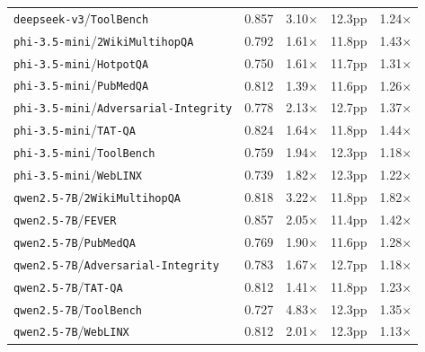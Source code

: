 \begin{longtable}{lcccc}
\texttt{deepseek-v3}/\texttt{ToolBench} & 0.857 & 3.10$\times$ & 12.3pp & 1.24$\times$ \\
\texttt{phi-3.5-mini}/\texttt{2WikiMultihopQA} & 0.792 & 1.61$\times$ & 11.8pp & 1.43$\times$ \\
\texttt{phi-3.5-mini}/\texttt{HotpotQA} & 0.750 & 1.61$\times$ & 11.7pp & 1.31$\times$ \\
\texttt{phi-3.5-mini}/\texttt{PubMedQA} & 0.812 & 1.39$\times$ & 11.6pp & 1.26$\times$ \\
\texttt{phi-3.5-mini}/\texttt{Adversarial-Integrity} & 0.778 & 2.13$\times$ & 12.7pp & 1.37$\times$ \\
\texttt{phi-3.5-mini}/\texttt{TAT-QA} & 0.824 & 1.64$\times$ & 11.8pp & 1.44$\times$ \\
\texttt{phi-3.5-mini}/\texttt{ToolBench} & 0.759 & 1.94$\times$ & 12.3pp & 1.18$\times$ \\
\texttt{phi-3.5-mini}/\texttt{WebLINX} & 0.739 & 1.82$\times$ & 12.3pp & 1.22$\times$ \\
\texttt{qwen2.5-7B}/\texttt{2WikiMultihopQA} & 0.818 & 3.22$\times$ & 11.8pp & 1.82$\times$ \\
\texttt{qwen2.5-7B}/\texttt{FEVER} & 0.857 & 2.05$\times$ & 11.4pp & 1.42$\times$ \\
\texttt{qwen2.5-7B}/\texttt{PubMedQA} & 0.769 & 1.90$\times$ & 11.6pp & 1.28$\times$ \\
\texttt{qwen2.5-7B}/\texttt{Adversarial-Integrity} & 0.783 & 1.67$\times$ & 12.7pp & 1.18$\times$ \\
\texttt{qwen2.5-7B}/\texttt{TAT-QA} & 0.812 & 1.41$\times$ & 11.8pp & 1.23$\times$ \\
\texttt{qwen2.5-7B}/\texttt{ToolBench} & 0.727 & 4.83$\times$ & 12.3pp & 1.35$\times$ \\
\texttt{qwen2.5-7B}/\texttt{WebLINX} & 0.812 & 2.01$\times$ & 12.3pp & 1.13$\times$ \\
\bottomrule
\end{longtable}
